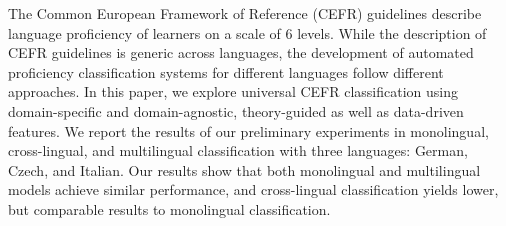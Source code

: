 The Common European Framework of Reference (CEFR) guidelines describe language proficiency of learners on a scale of 6 levels. While the description of CEFR guidelines is generic across languages, the development of automated proficiency classification systems for different languages follow different approaches. In this paper, we explore universal CEFR classification using  domain-specific and domain-agnostic, theory-guided as well as data-driven features. We report the results of our preliminary experiments in monolingual, cross-lingual, and multilingual classification with three languages: German, Czech, and Italian. Our results show that both monolingual and multilingual models achieve similar performance, and cross-lingual classification yields lower, but comparable results to monolingual classification.
